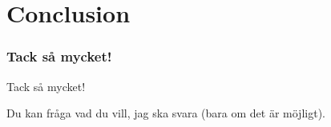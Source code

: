 \documentclass{beamer}
\begin{document}
\section{Conclusion}

\begin{frame}
\frametitle{Tack s\r{a} mycket!}

Tack s\r{a} mycket!

Du kan fr\r{a}ga vad du vill, jag ska svara (bara om det \"ar m\"ojligt).

\end{frame}
\end{document}
